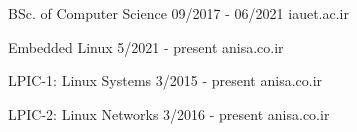 \documentclass[a4paper,12pt]{memoir} %
\begin{document}
\clearpage %

\userinformation %

\framebreak %






{BSc. of Computer Science}
{09/2017 - 06/2021}
{}
{iauet.ac.ir}


\Sep %







{Embedded Linux}
{5/2021 - present}
{}
{anisa.co.ir}


{LPIC-1: Linux Systems}
{3/2015 - present}
{}
{anisa.co.ir}


{LPIC-2: Linux Networks}
{3/2016 - present}
{}
{anisa.co.ir}

\end{document}
